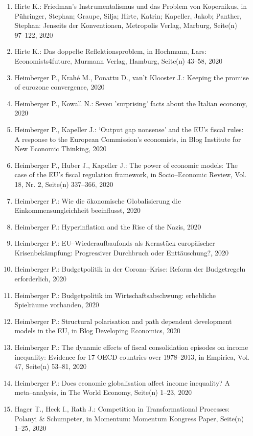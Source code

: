 \begin{enumerate}
	 \item Hirte K.: Friedman’s Instrumentalismus und das Problem von Kopernikus, in Pühringer, Stephan; Graupe, Silja; Hirte, Katrin; Kapeller, Jakob; Panther, Stephan: Jenseits der Konventionen, Metropolis Verlag, Marburg, Seite(n) 97--122, 2020
	 \item Hirte K.: Das doppelte Reflektionsproblem, in Hochmann, Lars: Economists4future, Murmann Verlag, Hamburg, Seite(n) 43--58, 2020
	 \item Heimberger P., Krahé M., Ponattu D., van't Klooster J.: Keeping the promise of eurozone convergence, 2020
	 \item Heimberger P., Kowall N.: Seven ’surprising’ facts about the Italian economy, 2020
	 \item Heimberger P., Kapeller J.: ‘Output gap nonsense’ and the EU’s fiscal rules: A response to the European Commission’s economists, in Blog Institute for New Economic Thinking, 2020
	 \item Heimberger P., Huber J., Kapeller J.: The power of economic models: The case of the EU's fiscal regulation framework, in Socio--Economic Review, Vol. 18, Nr. 2, Seite(n) 337--366, 2020
	 \item Heimberger P.: Wie die ökonomische Globalisierung die Einkommensungleichheit beeinflusst, 2020
	 \item Heimberger P.: Hyperinflation and the Rise of the Nazis, 2020
	 \item Heimberger P.: EU--Wiederaufbaufonds als Kernstück europäischer Krisenbekämpfung: Progressiver Durchbruch oder Enttäuschung?, 2020
	 \item Heimberger P.: Budgetpolitik in der Corona--Krise: Reform der Budgetregeln erforderlich, 2020
	 \item Heimberger P.: Budgetpolitik im Wirtschaftsabschwung: erhebliche Spielräume vorhanden, 2020
	 \item Heimberger P.: Structural polarisation and path dependent development models in the EU, in Blog Developing Economics, 2020
	 \item Heimberger P.: The dynamic effects of fiscal consolidation episodes on income inequality: Evidence for 17 OECD countries over 1978--2013, in Empirica, Vol. 47, Seite(n) 53--81, 2020
	 \item Heimberger P.: Does economic globalisation affect income inequality? A meta--analysis, in The World Economy, Seite(n) 1--23, 2020
	 \item Hager T., Heck I., Rath J.: Competition in Transformational Processes: Polanyi \& Schumpeter, in Momentum: Momentum Kongress Paper, Seite(n) 1--25, 2020

\end{enumerate}
